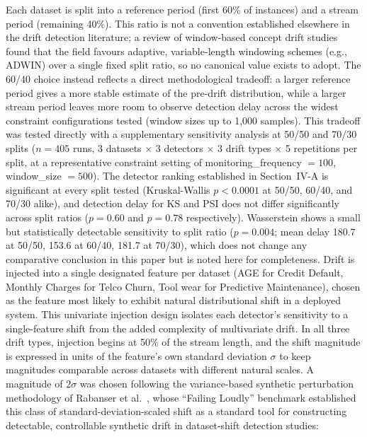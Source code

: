 \documentclass[conference]{IEEEtran}
\begin{document}
Each dataset is split into a reference period (first 60\% of instances) and a stream period (remaining 40\%). This ratio is not a convention established elsewhere in the drift detection literature; a review of window-based concept drift studies found that the field favours adaptive, variable-length windowing schemes (e.g., ADWIN) over a single fixed split ratio, so no canonical value exists to adopt. The 60/40 choice instead reflects a direct methodological tradeoff: a larger reference period gives a more stable estimate of the pre-drift distribution, while a larger stream period leaves more room to observe detection delay across the widest constraint configurations tested (window sizes up to 1,000 samples). This tradeoff was tested directly with a supplementary sensitivity analysis at 50/50 and 70/30 splits ($n=405$ runs, 3 datasets $\times$ 3 detectors $\times$ 3 drift types $\times$ 5 repetitions per split, at a representative constraint setting of monitoring\_frequency $=100$, window\_size $=500$). The detector ranking established in Section~IV-A is significant at every split tested (Kruskal-Wallis $p<0.0001$ at 50/50, 60/40, and 70/30 alike), and detection delay for KS and PSI does not differ significantly across split ratios ($p=0.60$ and $p=0.78$ respectively). Wasserstein shows a small but statistically detectable sensitivity to split ratio ($p=0.004$; mean delay 180.7 at 50/50, 153.6 at 60/40, 181.7 at 70/30), which does not change any comparative conclusion in this paper but is noted here for completeness. Drift is injected into a single designated feature per dataset (AGE for Credit Default, Monthly Charges for Telco Churn, Tool wear for Predictive Maintenance), chosen as the feature most likely to exhibit natural distributional shift in a deployed system. This univariate injection design isolates each detector's sensitivity to a single-feature shift from the added complexity of multivariate drift. In all three drift types, injection begins at 50\% of the stream length, and the shift magnitude is expressed in units of the feature's own standard deviation $\sigma$ to keep magnitudes comparable across datasets with different natural scales. A magnitude of $2\sigma$ was chosen following the variance-based synthetic perturbation methodology of Rabanser et al.~\cite{rabanser2019}, whose ``Failing Loudly'' benchmark established this class of standard-deviation-scaled shift as a standard tool for constructing detectable, controllable synthetic drift in dataset-shift detection studies:
\end{document}
